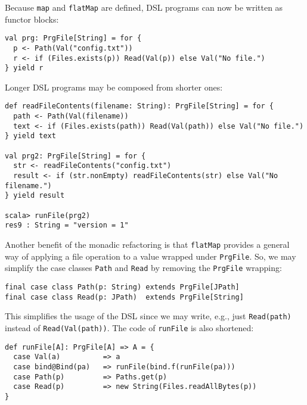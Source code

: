Because \lstinline!map!
and \lstinline!flatMap!
are defined, DSL programs can now be written as functor blocks:
\begin{lstlisting}
val prg: PrgFile[String] = for {
  p <- Path(Val("config.txt"))
  r <- if (Files.exists(p)) Read(Val(p)) else Val("No file.")
} yield r
\end{lstlisting}
Longer DSL programs may be composed from shorter ones:
\begin{lstlisting}
def readFileContents(filename: String): PrgFile[String] = for {
  path <- Path(Val(filename))
  text <- if (Files.exists(path)) Read(Val(path)) else Val("No file.")
} yield text

val prg2: PrgFile[String] = for {
  str <- readFileContents("config.txt")
  result <- if (str.nonEmpty) readFileContents(str) else Val("No filename.")
} yield result

scala> runFile(prg2)
res9 : String = "version = 1"
\end{lstlisting}
Another benefit of the monadic refactoring is that \lstinline!flatMap!
provides a general way of applying a file operation to a value wrapped
under \lstinline!PrgFile!.
So, we may simplify the case classes \lstinline!Path!
and \lstinline!Read! by
removing the \lstinline!PrgFile!
wrapping:
\begin{lstlisting}
final case class Path(p: String) extends PrgFile[JPath]
final case class Read(p: JPath)  extends PrgFile[String]
\end{lstlisting}
This simplifies the usage of the DSL since we may write, e.g., just
\lstinline!Read(path)!
instead of \lstinline!Read(Val(path))!.
The code of \lstinline!runFile!
is also shortened:
\begin{lstlisting}
def runFile[A]: PrgFile[A] => A = {
  case Val(a)          => a
  case bind@Bind(pa)   => runFile(bind.f(runFile(pa)))
  case Path(p)         => Paths.get(p)
  case Read(p)         => new String(Files.readAllBytes(p))
}
\end{lstlisting}

